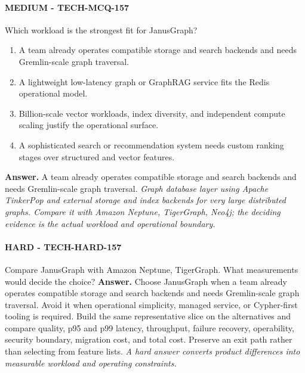 \paragraph{MEDIUM - TECH-MCQ-157} Which workload is the strongest fit for JanusGraph?
\begin{enumerate}[label=\Alph*.]
\item A team already operates compatible storage and search backends and needs Gremlin-scale graph traversal.
\item A lightweight low-latency graph or GraphRAG service fits the Redis operational model.
\item Billion-scale vector workloads, index diversity, and independent compute scaling justify the operational surface.
\item A sophisticated search or recommendation system needs custom ranking stages over structured and vector features.
\end{enumerate}
\textbf{Answer.} A team already operates compatible storage and search backends and needs Gremlin-scale graph traversal.
\textit{Graph database layer using Apache TinkerPop and external storage and index backends for very large distributed graphs. Compare it with Amazon Neptune, TigerGraph, Neo4j; the deciding evidence is the actual workload and operational boundary.}
\paragraph{HARD - TECH-HARD-157} Compare JanusGraph with Amazon Neptune, TigerGraph. What measurements would decide the choice?
\textbf{Answer.} Choose JanusGraph when a team already operates compatible storage and search backends and needs Gremlin-scale graph traversal. Avoid it when operational simplicity, managed service, or Cypher-first tooling is required. Build the same representative slice on the alternatives and compare quality, p95 and p99 latency, throughput, failure recovery, operability, security boundary, migration cost, and total cost. Preserve an exit path rather than selecting from feature lists.
\textit{A hard answer converts product differences into measurable workload and operating constraints.}

